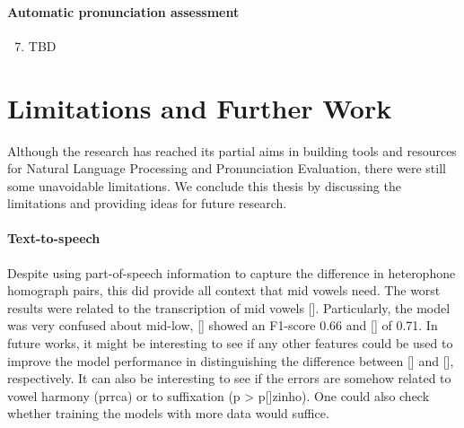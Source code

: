 \paragraph*{Automatic pronunciation assessment}
  \begin{enumerate}
    \setcounter{enumi}{6}
    \item TBD
  \end{enumerate}

\section*{Limitations and Further Work}\label{sec:limitations-further}

Although the research has reached its partial aims in building tools and resources for Natural Language Processing and Pronunciation Evaluation, there were still some unavoidable limitations. We conclude this thesis by discussing the limitations and providing ideas for future research.

\paragraph*{Text-to-speech}
Despite using part-of-speech information to capture the difference in heterophone homograph pairs, this did provide all context that mid vowels need. The worst results were related to the transcription of mid vowels []. Particularly, the model was very confused about mid-low, [] showed an F1-score 0.66 and [] of 0.71. In future works, it might be interesting to see if any other features could be used to improve the model performance in distinguishing the difference between [] and [], respectively. It can also be interesting to see if the errors are somehow related to vowel harmony (prrca) or to suffixation (p > p[]zinho). One could also check whether training the models with more data would suffice.

